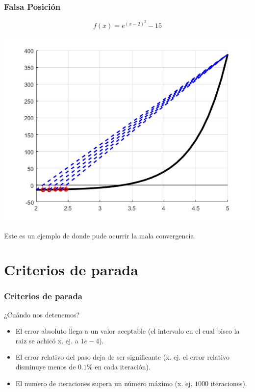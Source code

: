 \documentclass[xcolor=svgnames]{beamer} %
\theoremstyle{plain}
\theoremstyle{definition}
\begin{document}
\begin{frame}
\frametitle{Falsa Posición}

$$f(x) = e^{ (x-2)^2} - 15 $$
\begin{minipage}{.55\linewidth}
\includegraphics[scale=.45]{FalsaPosicion/malaConvergencia.png}
\end{minipage}
\begin{minipage}{.4\linewidth}
Este es un ejemplo de donde pude ocurrir la mala convergencia.


\end{minipage}

\end{frame}



\section{Criterios de parada}

\begin{frame}
\frametitle{Criterios de parada}
¿Cuándo nos detenemos?
\pause
\begin{itemize}
\item El error absoluto llega a un valor aceptable (el intervalo en el cual bisco la raiz se achicó x. ej. a $1e-4$).
\pause
\item El error relativo del paso deja de ser significante (x. ej. el error relativo disminuye menos de $0.1\%$ en cada iteración).
\pause
\item El numero de iteraciones supera un número máximo  (x. ej. $1000$ iteraciones).
\end{itemize}

\end{frame}
\end{document}
